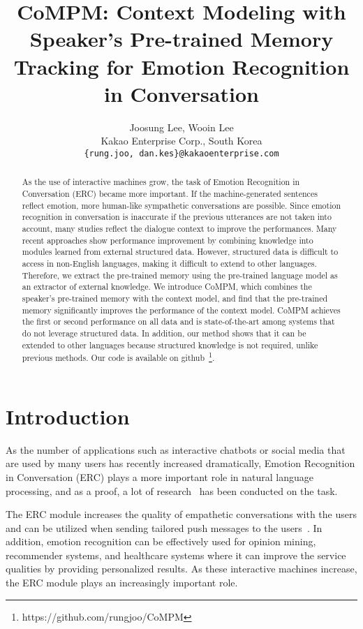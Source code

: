 \documentclass[11pt]{article}
\title{CoMPM: Context Modeling with Speaker's Pre-trained Memory Tracking for Emotion Recognition in Conversation}
\author{Joosung Lee, Wooin Lee \\
  Kakao Enterprise Corp., South Korea \\
  \texttt{\{rung.joo, dan.kes\}@kakaoenterprise.com} \\}
\begin{document}
\maketitle
\begin{abstract}
As the use of interactive machines grow, the task of Emotion Recognition in Conversation (ERC) became more important. If the machine-generated sentences reflect emotion, more human-like sympathetic conversations are possible. Since emotion recognition in conversation is inaccurate if the previous utterances are not taken into account, many studies reflect the dialogue context to improve the performances. Many recent approaches show performance improvement by combining knowledge into modules learned from external structured data. However, structured data is difficult to access in non-English languages, making it difficult to extend to other languages. Therefore, we extract the pre-trained memory using the pre-trained language model as an extractor of external knowledge. We introduce CoMPM, which combines the speaker's pre-trained memory with the context model, and find that the pre-trained memory significantly improves the performance of the context model. CoMPM achieves the first or second performance on all data and is state-of-the-art among systems that do not leverage structured data. In addition, our method shows that it can be extended to other languages because structured knowledge is not required, unlike previous methods. Our code is available on github~\footnote{https://github.com/rungjoo/CoMPM}.
\end{abstract}

\section{Introduction}
As the number of applications such as interactive chatbots or social media that are used by many users has recently increased dramatically, Emotion Recognition in Conversation (ERC) plays a more important role in natural language processing, and as a proof, a lot of research~\citep{ERC-research, ijcai2019-752, ghosal-etal-2020-cosmic, JiaoLK20} has been conducted on the task. 


The ERC module increases the quality of empathetic conversations with the users and can be utilized when sending tailored push messages to the users~\citep{shin2019happybot, ZandieM20, Lin_Xu_2020}. In addition, emotion recognition can be effectively used for opinion mining, recommender systems, and healthcare systems where it can improve the service qualities by providing personalized results. As these interactive machines increase, the ERC module plays an increasingly important role.
\end{document}
